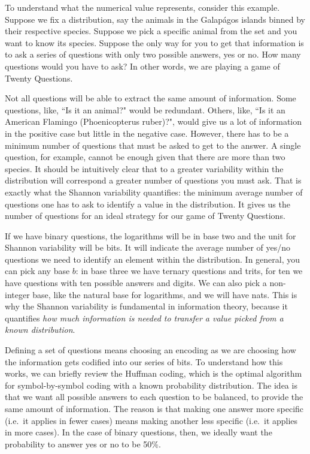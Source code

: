 \documentclass[iopart]{revtex4-1}
\begin{document}
To understand what the numerical value represents, consider this example. Suppose we fix a distribution, say the animals in the Galap\'{a}gos islands binned by their respective species. Suppose we pick a specific animal from the set and you want to know its species. Suppose the only way for you to get that information is to ask a series of questions with only two possible answers, yes or no. How many questions would you have to ask? In other words, we are playing a game of Twenty Questions.

Not all questions will be able to extract the same amount of information. Some questions, like, ``Is it an animal?" would be redundant. Others, like, ``Is it an American Flamingo (Phoenicopterus ruber)?", would give us a lot of information in the positive case but little in the negative case. However, there has to be a minimum number of questions that must be asked to get to the answer. A single question, for example, cannot be enough given that there are more than two species. It should be intuitively clear that to a greater variability within the distribution will correspond a greater number of questions you must ask. That is exactly what the Shannon variability quantifies: the minimum average number of questions one has to ask to identify a value in the distribution. It gives us the number of questions for an ideal strategy for our game of Twenty Questions.

If we have binary questions, the logarithms will be in base two and the unit for Shannon variability will be bits. It will indicate the average number of yes/no questions we need to identify an element within the distribution. In general, you can pick any base $b$: in base three we have ternary questions and trits, for ten we have questions with ten possible answers and digits. We can also pick a non-integer base, like the natural base for logarithms, and we will have nats. This is why the Shannon variability is fundamental in information theory, because it quantifies \emph{how much information is needed to transfer a value picked from a known distribution}.

Defining a set of questions means choosing an encoding as we are choosing how the information gets codified into our series of bits. To understand how this works, we can briefly review the Huffman coding,\cite{Huffman} which is the optimal algorithm for symbol-by-symbol coding with a known probability distribution. The idea is that we want all possible answers to each question to be balanced, to provide the same amount of information. The reason is that making one answer more specific (i.e.~it applies in fewer cases) means making another less specific (i.e.~it applies in more cases). In the case of binary questions, then, we ideally want the probability to answer yes or no to be 50\%.
\end{document}
